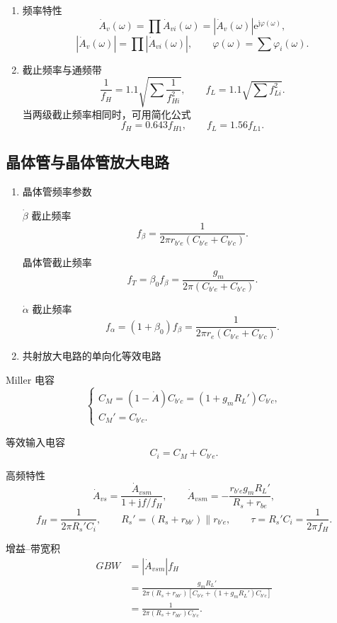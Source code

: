 \documentclass[UTF8,fontset=fandol,zihao=5]{ctexart}
\newcommand{\ee}{\mathrm{e}}
\newcommand{\jj}{\mathrm{j}}
\newcommand{\parallelsum}{\mathbin{\|}}
\begin{document}
\begin{enumerate}
  \item 频率特性
  \[
    \dot A_v(\omega)=\prod\dot A_{vi}(\omega)=|\dot A_v(\omega)|\ee^{\jj\varphi(\omega)},
  \]
  \[
    |\dot A_v(\omega)|=\prod|\dot A_{vi}(\omega)|,
    \qquad
    \varphi(\omega)=\sum\varphi_i(\omega).
  \]

  \item 截止频率与通频带
  \[
    \frac1{f_H}=1.1\sqrt{\sum\frac1{f_{Hi}^2}},
    \qquad
    f_L=1.1\sqrt{\sum f_{Li}^2}.
  \]
  当两级截止频率相同时，可用简化公式
  \[
    f_H=0.643f_{H1},
    \qquad
    f_L=1.56f_{L1}.
  \]
\end{enumerate}

\subsection{晶体管与晶体管放大电路}

\begin{enumerate}
  \item 晶体管频率参数

  $\dot\beta$ 截止频率
  \[
    f_\beta=\frac1{2\pi r_{b'e}(C_{b'e}+C_{b'c})}.
  \]

  晶体管截止频率
  \[
    f_T=\beta_0f_\beta=\frac{g_m}{2\pi(C_{b'e}+C_{b'c})}.
  \]

  $\dot\alpha$ 截止频率
  \[
    f_\alpha=(1+\beta_0)f_\beta=\frac1{2\pi r_e(C_{b'e}+C_{b'c})}.
  \]

  \item 共射放大电路的单向化等效电路
\end{enumerate}

Miller 电容
\[
  \begin{cases}
    C_M=(1-\dot A)C_{b'c}=(1+g_mR_L')C_{b'c},\\
    C_M'=C_{b'c}.
  \end{cases}
\]

等效输入电容
\[
  C_i=C_M+C_{b'e}.
\]

高频特性
\[
  \dot A_{vs}=\frac{\dot A_{vsm}}{1+\jj f/f_H},
  \qquad
  \dot A_{vsm}=-\frac{r_{b'e}g_mR_L'}{R_s+r_{be}},
\]
\[
  f_H=\frac1{2\pi R_s'C_i},
  \qquad
  R_s'=(R_s+r_{bb'})\parallelsum r_{b'e},
  \qquad
  \tau=R_s'C_i=\frac1{2\pi f_H}.
\]

增益--带宽积
\[
  \begin{aligned}
    GBW&=|\dot A_{vsm}|f_H\\
    &=\frac{g_mR_L'}{2\pi(R_s+r_{bb'})[C_{b'e}+(1+g_mR_L')C_{b'c}]}\\
    &=\frac1{2\pi(R_s+r_{bb'})C_{b'c}}.
  \end{aligned}
\]
\end{document}
